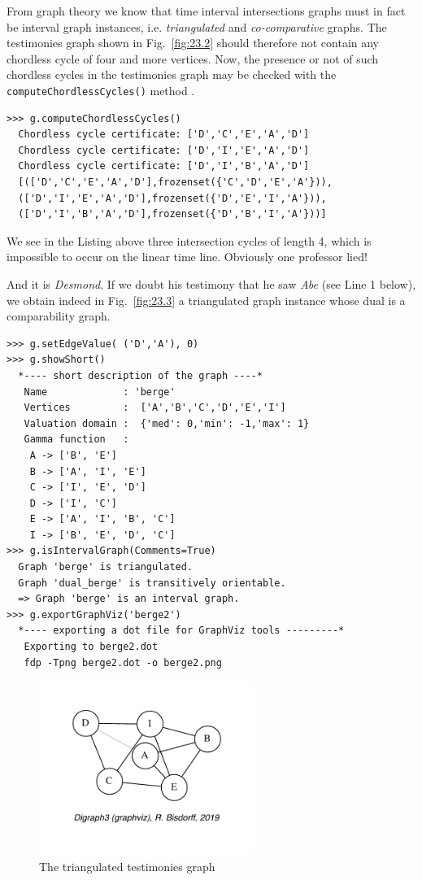 From graph theory we know that time interval intersections graphs must in fact be interval graph instances, i.e. \emph{triangulated} and \emph{co-comparative} graphs. The testimonies graph shown in Fig.~\vref{fig:23.2} should therefore not contain any chordless cycle of four and more vertices. Now, the presence or not of such chordless cycles in the testimonies graph may be checked with the \texttt{computeChordlessCycles()} method \citep{BIS-2010}.
\begin{lstlisting}
>>> g.computeChordlessCycles()
  Chordless cycle certificate: ['D','C','E','A','D']
  Chordless cycle certificate: ['D','I','E','A','D']
  Chordless cycle certificate: ['D','I','B','A','D']
  [(['D','C','E','A','D'],frozenset({'C','D','E','A'})),
  (['D','I','E','A','D'],frozenset({'D','E','I','A'})),
  (['D','I','B','A','D'],frozenset({'D','B','I','A'}))]
\end{lstlisting}
We see in the Listing above three intersection cycles of length 4, which is impossible to occur on the linear time line. Obviously one professor lied!

And it is \emph{Desmond}. If we doubt his testimony that he saw \emph{Abe} (see Line 1 below), we obtain indeed in Fig.~\vref{fig:23.3} a triangulated graph instance whose dual is a comparability graph.
\begin{lstlisting}
>>> g.setEdgeValue( ('D','A'), 0)
>>> g.showShort()
  *---- short description of the graph ----*
   Name             : 'berge'
   Vertices         :  ['A','B','C','D','E','I']
   Valuation domain :  {'med': 0,'min': -1,'max': 1}
   Gamma function   : 
    A -> ['B', 'E']
    B -> ['A', 'I', 'E']
    C -> ['I', 'E', 'D']
    D -> ['I', 'C']
    E -> ['A', 'I', 'B', 'C']
    I -> ['B', 'E', 'D', 'C']
>>> g.isIntervalGraph(Comments=True)
  Graph 'berge' is triangulated.
  Graph 'dual_berge' is transitively orientable.
  => Graph 'berge' is an interval graph.
>>> g.exportGraphViz('berge2')
  *---- exporting a dot file for GraphViz tools ---------*
   Exporting to berge2.dot
   fdp -Tpng berge2.dot -o berge2.png
\end{lstlisting}
\begin{figure}[h]
\sidecaption[t]
\includegraphics[width=7cm]{Figures/23-3-berge2.pdf}
\caption{The triangulated testimonies graph} 
\label{fig:23.3}       %
\end{figure}

